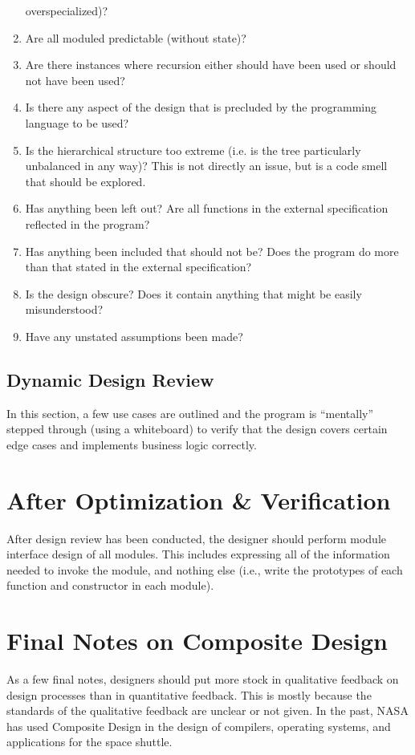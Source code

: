\documentclass{designdoc}
\begin{document}
\begin{enumerate}
  overspecialized)?
\item Are all moduled predictable (without state)?
\item Are there instances where recursion either should have been used or
  should not have been used?
\item Is there any aspect of the design that is precluded by the programming
  language to be used?
\item Is the hierarchical structure too extreme (i.e. is the tree particularly
  unbalanced in any way)? This is not directly an issue, but is a code smell
  that should be explored.
\item Has anything been left out? Are all functions in the external
  specification reflected in the program?
\item Has anything been included that should not be? Does the program do more
  than that stated in the external specification?
\item Is the design obscure? Does it contain anything that might be easily
  misunderstood?
\item Have any unstated assumptions been made?
\end{enumerate}

\subsection{Dynamic Design Review}
In this section, a few use cases are outlined and the program is ``mentally''
stepped through (using a whiteboard) to verify that the design covers certain
edge cases and implements business logic correctly.

\section{After Optimization \& Verification}
After design review has been conducted, the designer should perform module
interface design of all modules. This includes expressing all of the
information needed to invoke the module, and nothing else (i.e., write the
prototypes of each function and constructor in each module).

\section{Final Notes on Composite Design}
As a few final notes, designers should put more stock in qualitative feedback
on design processes than in quantitative feedback. This is mostly because the
standards of the qualitative feedback are unclear or not given. In the past,
NASA has used Composite Design in the design of compilers, operating systems,
and applications for the space shuttle.
\end{document}
